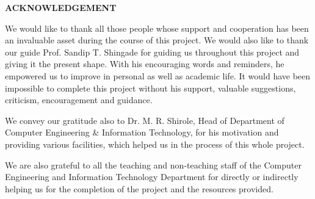 \begin{center}
    {\textbf{ACKNOWLEDGEMENT}}\\ \vspace{1cm}
\end{center}
\par We would like to thank all those people whose support and cooperation has been an invaluable asset during the course of this project. We would also like to thank our guide Prof. Sandip T. Shingade for guiding us throughout this project and giving it the present shape. With his encouraging words and reminders, he empowered us to improve in personal as well as academic life. It would have been impossible to complete this project without his support, valuable suggestions, criticism, encouragement and guidance.

\par We convey our gratitude also to Dr. M. R. Shirole, Head of Department of Computer Engineering \& Information Technology, for his motivation and providing various facilities, which helped us in the process of this whole project.

\par We are also grateful to all the teaching and non-teaching staff of the Computer Engineering and Information Technology Department for directly or indirectly helping us for the completion of the project and the resources provided.